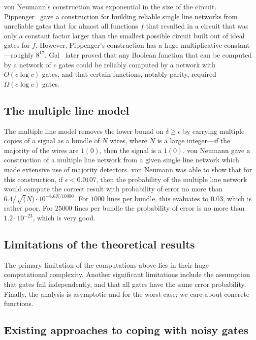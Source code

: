 von Neumann's construction was exponential in the size of the circuit.
Pippenger~\cite{pippenger-noisy-85} gave a construction for building
reliable single line networks from unreliable gates
that for almost all functions $f$ that resulted in a circuit that was only 
a constant factor larger than the smallest possible circuit built out of ideal gates
for $f$.  However, Pippenger's construction has a huge multiplicative 
constant---roughly $8^{17}$.   Gal~\cite{gal-noisy-91} later proved
that any Boolean function that can be computed by a network of 
$c$ gates could be reliably computed by a network with $O(c \log c)$ gates,
and that certain functions, notably parity, required $\Omega( c \log c )$ gates.

\subsection*{The multiple line model}

The multiple line model removes the lower bound on $\delta \geq \epsilon$ by 
carrying multiple copies of a signal as a bundle of $N$ wires, where $N$ is a large
integer---if the majority of the wires  are $1(0)$, then the signal is a $1(0)$.
von Neumann gave a construction of a multiple line network from a given single line network
which made extensive use of majority detectors.  von Neumann was able to show 
that for this construction, if $\epsilon < 0.0107$, then the probability of the 
multiple line network would compute the correct result with probability of error
no more than $6.4/\sqrt(N) \cdot 10^{-8.6 N / 10000}$. For $1000$ lines per bundle,
this evaluates to $0.03$, which is rather poor.  For 25000 lines per bundle
the probability of error is no more than $1.2 \cdot 10^{-23}$, which is very good.

\subsection*{Limitations of the theoretical results}

The primary limitation of the computations above lies in their huge computational
complexity.  Another significant limitations include the assumption that gates
fail independently, and that all gates have the same error probability.
Finally, the analysis is asymptotic and for the worst-case; we care about 
concrete functions.

\subsection*{Existing approaches to coping with noisy gates}

